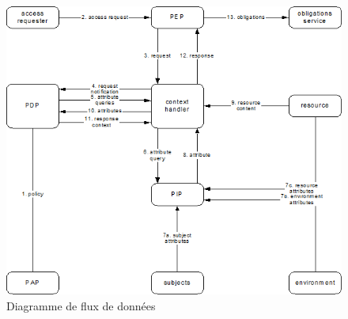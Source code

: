 \begin{figure}[h!]
    \centering
		\includegraphics[scale=4.9]{chap4/images/fluxDonnee.png}
    \caption{Diagramme de flux de données \cite{standard13}}
	 \label{figflux}
\end{figure} 

